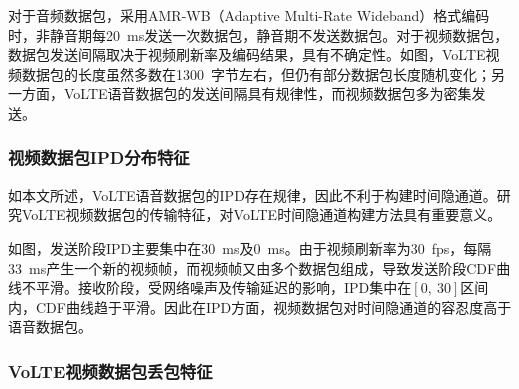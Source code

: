 对于音频数据包，采用AMR-WB（Adaptive Multi-Rate Wideband）格式编码时，非静音期每{20\ ms}发送一次数据包，静音期不发送数据包。对于视频数据包，数据包发送间隔取决于视频刷新率及编码结果，具有不确定性。如图，VoLTE视频数据包的长度虽然多数在{1300\ 字节}左右，但仍有部分数据包长度随机变化；另一方面，VoLTE语音数据包的发送间隔具有规律性，而视频数据包多为密集发送。

\subsubsection{视频数据包IPD分布特征}
\label{chap:backinfo:volte:packets:ipd}
如本文所述，VoLTE语音数据包的IPD存在规律，因此不利于构建时间隐通道。研究VoLTE视频数据包的传输特征，对VoLTE时间隐通道构建方法具有重要意义。


如图，发送阶段IPD主要集中在{30\ ms}及{0\ ms}。由于视频刷新率为{30\ fps}，每隔{33\ ms}产生一个新的视频帧，而视频帧又由多个数据包组成，导致发送阶段CDF曲线不平滑。接收阶段，受网络噪声及传输延迟的影响，IPD集中在$[0,\ 30]$区间内，CDF曲线趋于平滑。因此在IPD方面，视频数据包对时间隐通道的容忍度高于语音数据包。

\subsubsection{VoLTE视频数据包丢包特征}
\label{chap:backinfo:volte:packets:dropout}


